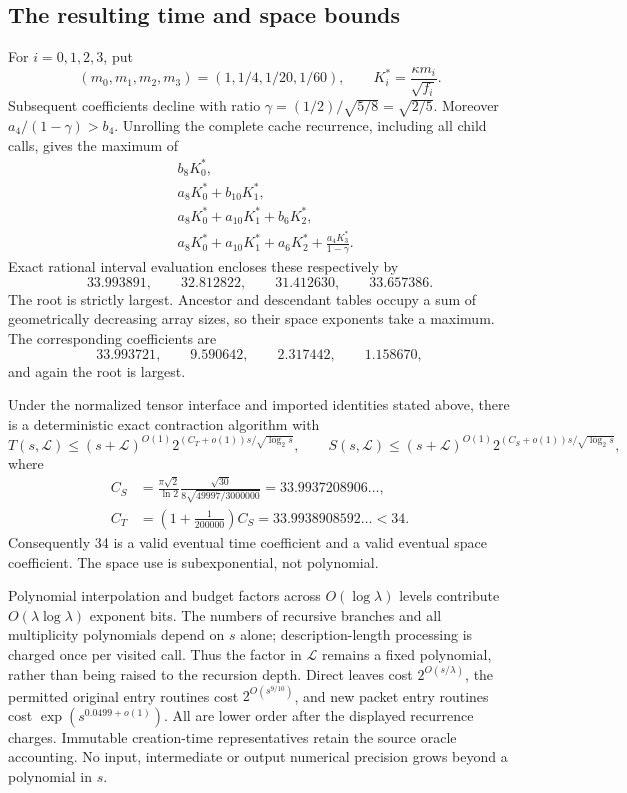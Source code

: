 \subsection{The resulting time and space bounds}

For $i=0,1,2,3$, put
\[
 (m_0,m_1,m_2,m_3)=(1,1/4,1/20,1/60),\qquad
 K_i^*=\frac{\kappa m_i}{\sqrt{f_i}}.
\]
Subsequent coefficients decline with ratio
$\gamma=(1/2)/\sqrt{5/8}=\sqrt{2/5}$. Moreover
$a_4/(1-\gamma)>b_4$. Unrolling the complete cache recurrence, including all
child calls, gives the maximum of
\begin{align*}
 &b_8K_0^*,\\
 &a_8K_0^*+b_{10}K_1^*,\\
 &a_8K_0^*+a_{10}K_1^*+b_6K_2^*,\\
 &a_8K_0^*+a_{10}K_1^*+a_6K_2^*
       +\frac{a_4K_3^*}{1-\gamma}.
\end{align*}
Exact rational interval evaluation encloses these respectively by
\[
 33.993891,\qquad32.812822,\qquad31.412630,\qquad33.657386.
\]
The root is strictly largest. Ancestor and descendant tables occupy a sum
of geometrically decreasing array sizes, so their space exponents take a
maximum. The corresponding coefficients are
\[
 33.993721,\qquad9.590642,\qquad2.317442,\qquad1.158670,
\]
and again the root is largest.

\begin{theorem}
\label{thm:rectangular-new}
Under the normalized tensor interface and imported identities stated above,
there is a deterministic exact contraction algorithm with
\[
 T(s,\mathcal L)\le(s+\mathcal L)^{O(1)}
       2^{(C_T+o(1))s/\sqrt{\log_2s}},\qquad
 S(s,\mathcal L)\le(s+\mathcal L)^{O(1)}
       2^{(C_S+o(1))s/\sqrt{\log_2s}},
\]
where
\begin{align*}
 C_S&=\frac{\pi\sqrt2}{\ln2}
       \frac{\sqrt{30}}{8\sqrt{49997/3000000}}
       =33.9937208906\ldots,\\
 C_T&=\left(1+\frac1{200000}\right)C_S
       =33.9938908592\ldots<34.
\end{align*}
Consequently 34 is a valid eventual time coefficient and a valid eventual
space coefficient. The space use is subexponential, not polynomial.
\end{theorem}

Polynomial interpolation and budget factors across $O(\log\lambda)$ levels
contribute $O(\lambda\log\lambda)$ exponent bits. The numbers of
recursive branches and all multiplicity polynomials depend on $s$ alone;
description-length processing is charged once per visited call. Thus the
factor in $\mathcal L$ remains a fixed polynomial, rather than being
raised to the recursion depth. Direct leaves cost
$2^{O(s/\lambda)}$, the permitted original entry routines cost
$2^{O(s^{9/10})}$, and new packet entry routines cost
$\exp(s^{0.0499+o(1)})$. All are lower order after the displayed recurrence
charges. Immutable creation-time representatives retain the source oracle
accounting. No input, intermediate or output numerical precision grows beyond
a polynomial in $s$.

